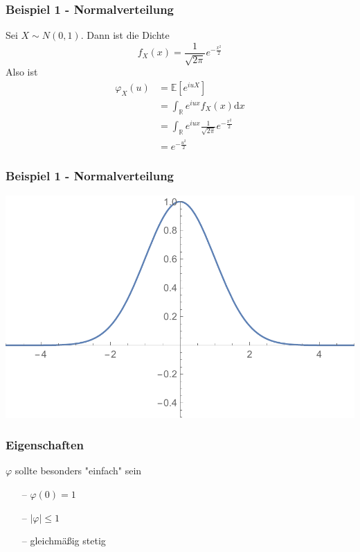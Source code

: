 \documentclass{beamer}
\newcommand{\R}{\mathbb{R}}
\newcommand{\E}{\mathbb{E}}
\newcommand\dint{\mathord{\mathrm{d}}}
\begin{document}
\begin{frame}
\frametitle{Beispiel 1 - Normalverteilung}
Sei $X \sim N(0,1)$. Dann ist die Dichte
{\footnotesize
$$ f_X(x) = \frac{1}{\sqrt{2 \pi}} e^{-\frac{x^2}{2}} $$
}%
Also ist
{\footnotesize
\begin{align*}
\varphi_X(u) &= \E[e^{iuX}]\\
&= \int_\R e^{iux}f_X(x) \dint x\\
&= \int_\R e^{iux} \frac{1}{\sqrt{2 \pi}} e^{-\frac{x^2}{2}}\\
&= e^{-\frac{u^2}{2}}
\end{align*}
}%
\end{frame}

\begin{frame}
\frametitle{Beispiel 1 - Normalverteilung}
\includegraphics[width=\linewidth, height=\textheight,keepaspectratio]{presentation/plots/normal_char.pdf}
\end{frame}

\begin{frame}
\frametitle{Eigenschaften}
$\varphi$ sollte besonders "einfach" sein
\hfill \newline
\begin{itemize}
    \setlength\itemsep{1em}
    \item[--] $\varphi(0) = 1$
    \item[--] $|\varphi| \leq 1$
    \item[--] gleichmäßig stetig
\end{itemize}
\end{frame}
\end{document}
